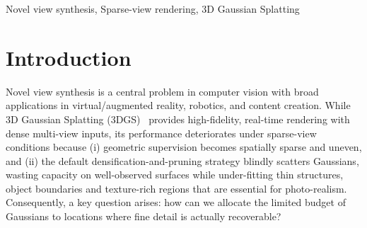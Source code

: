 \documentclass{article}
\begin{document}
  \begin{keywords}
  Novel view synthesis, Sparse-view rendering, 3D Gaussian Splatting
  \end{keywords}
  \section{Introduction}
  \label{sec:intro}
  
  
  Novel view synthesis is a central problem in computer vision with broad applications in virtual/augmented reality, robotics, and content creation. While 3D Gaussian Splatting (3DGS)~\cite{kerbl20233d} provides high-fidelity, real-time rendering with dense multi-view inputs, its performance deteriorates under sparse-view conditions because (i) geometric supervision becomes spatially sparse and uneven, and (ii) the default densification-and-pruning strategy blindly scatters Gaussians, wasting capacity on well-observed surfaces while under-fitting thin structures, object boundaries and texture-rich regions that are essential for photo-realism. Consequently, a key question arises: how can we allocate the limited budget of Gaussians to locations where fine detail is actually recoverable?
  
\end{document}
